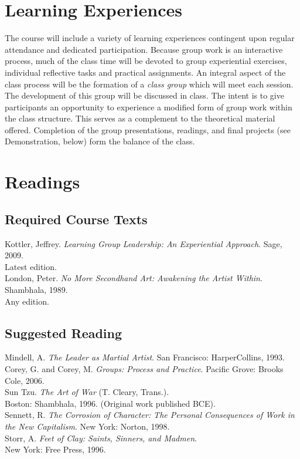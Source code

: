 \documentclass[letterpaper,10pt,headsepline]{scrreprt}
\begin{document}
\section{Learning Experiences}
The course will include a variety of learning experiences contingent upon regular attendance and dedicated participation. Because group work is an interactive process, much of the class time will be devoted to group experiential exercises, individual reflective tasks and practical assignments. An integral aspect of the class process will be the formation of a \emph{class group} which will meet each session. The development of this group will be discussed in class. The intent is to give participants an opportunity to experience a modified form of group work within the class structure. This serves as a complement to the theoretical material offered.
Completion of the group presentations, readings, and final projects (see Demonstration, below) form the balance of the class.

\section{Readings}

\subsection{Required Course Texts}
\noindent
Kottler, Jeffrey. \textit{Learning Group Leadership: An Experiential Approach}. Sage, 2009.\\ Latest edition.\\
London, Peter. \textit{No More Secondhand Art: Awakening the Artist Within}. Shambhala, 1989.\\ Any edition.

\subsection{Suggested Reading}
\noindent
Mindell, A. \textit{The Leader as Martial Artist}. San Francisco: HarperCollins, 1993.\\
Corey, G. and Corey, M. \textit{Groups: Process and Practice}. Pacific Grove: Brooks Cole, 2006. \\
Sun Tzu. \textit{The Art of War} (T. Cleary, Trans.). \\Boston: Shambhala, 1996.  (Original work published BCE).\\
Sennett, R. \textit{The Corrosion of Character: The Personal Consequences of Work in the New Capitalism}. New York: Norton, 1998.\\
Storr, A. \textit{Feet of Clay: Saints, Sinners, and Madmen}.\\ New York: Free Press, 1996.\\
\end{document}
